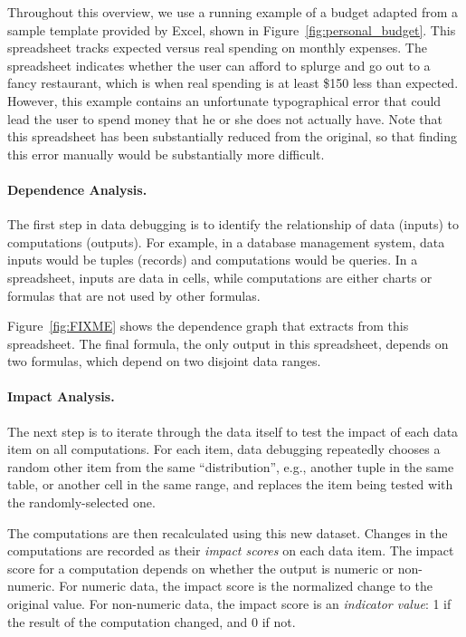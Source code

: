 Throughout this overview, we use a running example of a budget adapted
from a sample template provided by Excel,
shown in Figure~\ref{fig:personal_budget}. This spreadsheet tracks
expected versus real spending on monthly expenses. The spreadsheet
indicates whether the user can afford to splurge and go out to a fancy
restaurant, which is when real spending is at least \$150 less than
expected. However, this example contains an unfortunate typographical
error that could lead the user to spend money that he or she does not
actually have. Note that this spreadsheet has been substantially
reduced from the original, so that finding this error manually would
be substantially more difficult.

\paragraph{Dependence Analysis.}
The first step in data debugging is to identify the relationship of
data (inputs) to computations (outputs). For example, in a database
management system, data inputs would be tuples (records) and computations would
be queries. In a spreadsheet, inputs are data in cells, while
computations are either charts or formulas that are not used by other formulas.

Figure~\ref{fig:FIXME} shows the dependence graph that \checkcell{}
extracts from this spreadsheet. The final formula, the only output in
this spreadsheet, depends on two formulas, which depend on two
disjoint data ranges.

\paragraph{Impact Analysis.}
The next step is to iterate through the data itself to test the impact
of each data item on all computations. For each item, data debugging
repeatedly chooses a random other item from the same ``distribution'',
e.g., another tuple in the same table, or another cell in the same
range, and replaces the item being tested with the randomly-selected
one.

The computations are then recalculated using this new dataset. Changes
in the computations are recorded as their \emph{impact scores} on each
data item.  The impact score for a computation depends on whether the
output is numeric or non-numeric. For numeric data, the impact score
is the normalized change to the original value.
For non-numeric data, the impact score is an \emph{indicator value}: 1
if the result of the computation changed, and 0 if not.

